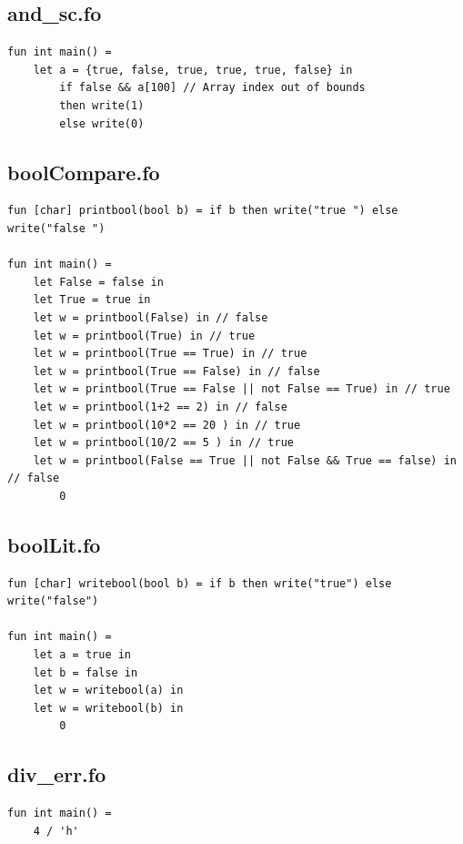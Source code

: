 \documentclass[11pt]{article}
\begin{document}
    \subsection{and_sc.fo}
    \begin{lstlisting}[basicstyle=\small]
fun int main() =
    let a = {true, false, true, true, true, false} in
        if false && a[100] // Array index out of bounds
        then write(1)
        else write(0)
    \end{lstlisting}

    \subsection{boolCompare.fo}
    \begin{lstlisting}[basicstyle=\small]
fun [char] printbool(bool b) = if b then write("true ") else write("false ")

fun int main() =
    let False = false in
    let True = true in
    let w = printbool(False) in // false
    let w = printbool(True) in // true
    let w = printbool(True == True) in // true
    let w = printbool(True == False) in // false
    let w = printbool(True == False || not False == True) in // true
    let w = printbool(1+2 == 2) in // false
    let w = printbool(10*2 == 20 ) in // true
    let w = printbool(10/2 == 5 ) in // true
    let w = printbool(False == True || not False && True == false) in // false
        0
    \end{lstlisting}

    \subsection{boolLit.fo}
    \begin{lstlisting}[basicstyle=\small]
fun [char] writebool(bool b) = if b then write("true") else write("false")

fun int main() =
    let a = true in
    let b = false in
    let w = writebool(a) in
    let w = writebool(b) in
        0
    \end{lstlisting}

    \subsection{div\_err.fo}
    \begin{lstlisting}[basicstyle=\small]
fun int main() =
    4 / 'h'
    \end{lstlisting}
\end{document}
